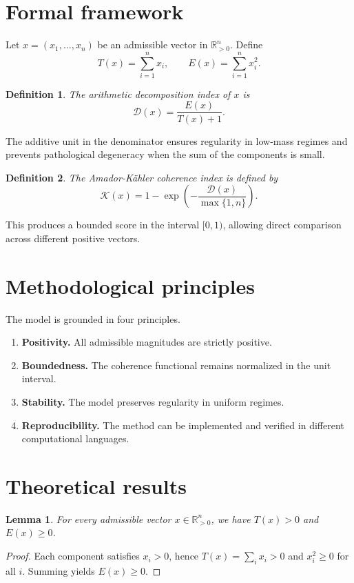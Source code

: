 \documentclass[11pt]{article}
\newtheorem{definition}{Definition}
\newtheorem{lemma}{Lemma}
\begin{document}
\section{Formal framework}
Let $x=(x_1,\ldots,x_n)$ be an admissible vector in $\mathbb{R}_{>0}^n$. Define
\begin{equation}
T(x)=\sum_{i=1}^{n}x_i, \qquad E(x)=\sum_{i=1}^{n}x_i^2.
\end{equation}

\begin{definition}
The arithmetic decomposition index of $x$ is
\begin{equation}
\mathcal{D}(x)=\frac{E(x)}{T(x)+1}.
\end{equation}
\end{definition}

The additive unit in the denominator ensures regularity in low-mass regimes and prevents pathological degeneracy when the sum of the components is small.

\begin{definition}
The Amador-Kähler coherence index is defined by
\begin{equation}
\mathcal{K}(x)=1-\exp\left(-\frac{\mathcal{D}(x)}{\max\{1,n\}}\right).
\end{equation}
\end{definition}

This produces a bounded score in the interval $[0,1)$, allowing direct comparison across different positive vectors.

\section{Methodological principles}
The model is grounded in four principles.

\begin{enumerate}[label=\textbf{P\arabic*.}]
\item \textbf{Positivity.} All admissible magnitudes are strictly positive.
\item \textbf{Boundedness.} The coherence functional remains normalized in the unit interval.
\item \textbf{Stability.} The model preserves regularity in uniform regimes.
\item \textbf{Reproducibility.} The method can be implemented and verified in different computational languages.
\end{enumerate}

\section{Theoretical results}
\begin{lemma}
For every admissible vector $x\in\mathbb{R}_{>0}^n$, we have $T(x)>0$ and $E(x)\ge 0$.
\end{lemma}
\begin{proof}
Each component satisfies $x_i>0$, hence $T(x)=\sum_i x_i>0$ and $x_i^2\ge 0$ for all $i$. Summing yields $E(x)\ge 0$.
\end{proof}
\end{document}
